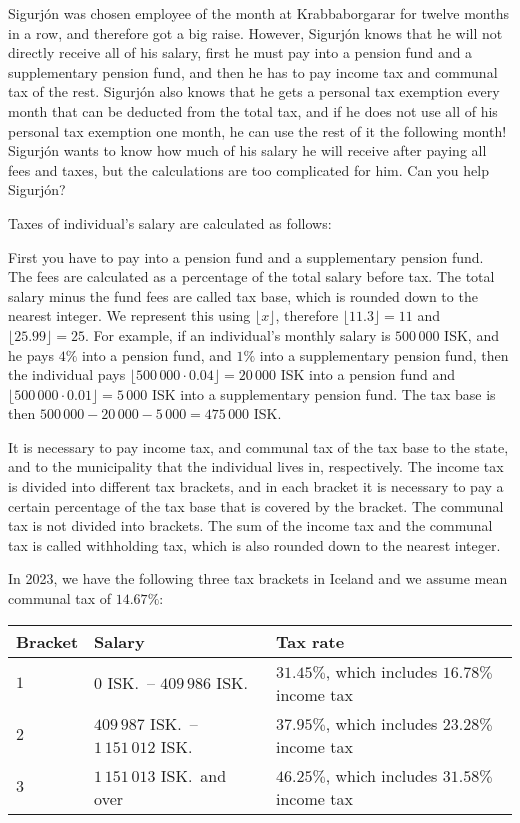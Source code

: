 
Sigurjón was chosen employee of the month at Krabbaborgarar for twelve months in
a row, and therefore got a big raise. However, Sigurjón knows that he will not
directly receive all of his salary, first he must pay into a pension fund and a
supplementary pension fund, and then he has to pay income tax and communal tax of the
rest. Sigurjón also knows that he gets a personal tax exemption every month that
can be deducted from the total tax, and if he does not use all of his personal
tax exemption one month, he can use the rest of it the following month! Sigurjón
wants to know how much of his salary he will receive after paying all fees and
taxes, but the calculations are too complicated for him. Can you help Sigurjón?

Taxes of individual's salary are calculated as follows:

First you have to pay into a pension fund and a supplementary pension fund. The fees
are calculated as a percentage of the total salary before tax. The total salary
minus the fund fees are called tax base, which is rounded down to the nearest
integer. We represent this using $\lfloor x \rfloor$, therefore $\lfloor 11.3 \rfloor = 11$
and $\lfloor 25.99 \rfloor = 25$.
For example, if an individual's monthly salary is $500\,000$ ISK, and
he pays $4\%$ into a pension fund, and $1\%$ into a supplementary pension fund, then
the individual pays $\lfloor 500\,000 \cdot 0.04 \rfloor = 20\,000$ ISK into a pension fund and
$\lfloor 500\,000 \cdot 0.01 \rfloor = 5\,000$ ISK into a supplementary pension fund. The tax base is
then $500\,000 - 20\,000 - 5\,000 = 475\,000$ ISK.

It is necessary to pay income tax, and communal tax of the tax base to the
state, and to the municipality that the individual lives in, respectively.  The
income tax is divided into different tax brackets, and in each bracket it is
necessary to pay a certain percentage of the tax base that is covered by the
bracket. The communal tax is not divided into brackets. The sum of the income
tax and the communal tax is called withholding tax, which is also rounded down
to the nearest integer.

In 2023, we have the following three tax brackets in Iceland and we assume mean
communal tax of $14.67\%$:

\begin{table}[h]
\begin{tabular}{lll}
    Bracket & Salary & Tax rate \\ \hline
    $1$ & $0$ ISK.\ -- $409\,986$ ISK. & $31.45\%$, which includes $16.78\%$ income tax \\
    $2$ & $409\,987$ ISK.\ -- $1\,151\,012$ ISK. & $37.95\%$, which includes $23.28\%$ income tax \\
    $3$ & $1\,151\,013$ ISK.\ and over & $46.25\%$, which includes $31.58\%$ income tax \\
\end{tabular}
\end{table}

